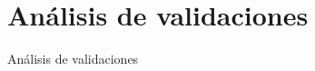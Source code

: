 \section{An\'alisis de validaciones}
\label{Analisis_validaciones}

An\'alisis de validaciones
\par


